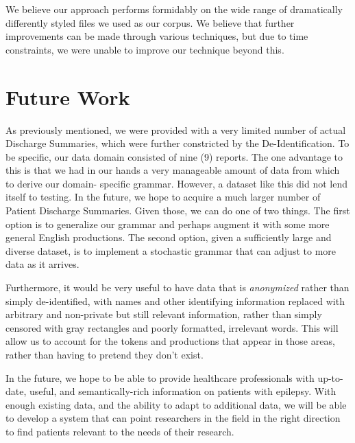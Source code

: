 \documentclass{acm_proc_article-sp}
\begin{document}
We believe our approach performs formidably on the wide range of dramatically differently styled files
we used as our corpus. We believe that further improvements can be made through various techniques, but due to
time constraints, we were unable to improve our technique beyond this.

\section{Future Work}
As previously mentioned, we were provided with a very limited number of actual Discharge
Summaries, which were further constricted by the De-Identification. To be specific,
our data domain consisted of nine (9) reports. The one advantage to this is that we
had in our hands a very manageable amount of data from which to derive our domain-
specific grammar. However, a dataset like this did not lend itself to testing. In
the future, we hope to acquire a much larger number of Patient Discharge Summaries.
Given those, we can do one of two things. The first option is to generalize our grammar
and perhaps augment it with some more general English productions. The second option,
given a sufficiently large and diverse dataset, is to implement a stochastic grammar
that can adjust to more data as it arrives.

Furthermore, it would be very useful to have data that is \emph{anonymized} rather
than simply de-identified, with names and other identifying information replaced
with arbitrary and non-private but still relevant information, rather than simply
censored with gray rectangles and poorly formatted, irrelevant words. This will allow
us to account for the tokens and productions that appear in those areas, rather than
having to pretend they don't exist.

In the future, we hope to be able to provide healthcare professionals with up-to-date,
useful, and semantically-rich information on patients with epilepsy. With enough
existing data, and the ability to adapt to additional data, we will be able to develop
a system that can point researchers in the field in the right direction to find patients
relevant to the needs of their research.
{}

\end{document}
